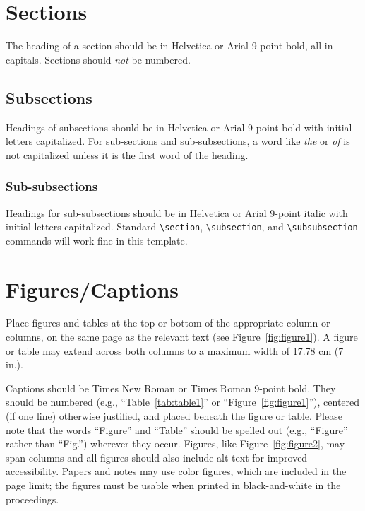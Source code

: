 \documentclass{sigchi}
\begin{document}
\section{Sections}

The heading of a section should be in Helvetica or Arial 9-point bold,
all in capitals. Sections should \textit{not} be numbered.

\subsection{Subsections}

Headings of subsections should be in Helvetica or Arial 9-point bold
with initial letters capitalized.  For sub-sections and
sub-subsections, a word like \emph{the} or \emph{of} is not
capitalized unless it is the first word of the heading.

\subsubsection{Sub-subsections}

Headings for sub-subsections should be in Helvetica or Arial 9-point
italic with initial letters capitalized.  Standard
\texttt{{\textbackslash}section}, \texttt{{\textbackslash}subsection},
and \texttt{{\textbackslash}subsubsection} commands will work fine in
this template.

\section{Figures/Captions}

Place figures and tables at the top or bottom of the appropriate
column or columns, on the same page as the relevant text (see
Figure~\ref{fig:figure1}). A figure or table may extend across both
columns to a maximum width of 17.78 cm (7 in.).


Captions should be Times New Roman or Times Roman 9-point bold.  They
should be numbered (e.g., ``Table~\ref{tab:table1}'' or
``Figure~\ref{fig:figure1}''), centered (if one line) otherwise justified, and placed beneath the figure
or table.  Please note that the words ``Figure'' and ``Table'' should
be spelled out (e.g., ``Figure'' rather than ``Fig.'') wherever they
occur. Figures, like Figure~\ref{fig:figure2}, may span columns and
all figures should also include alt text for improved accessibility.
Papers and notes may use color figures, which are included in the page
limit; the figures must be usable when printed in black-and-white in
the proceedings.
\end{document}
